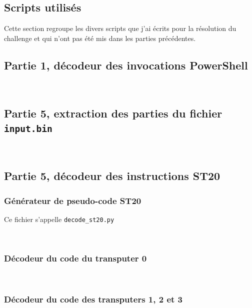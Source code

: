 \documentclass[a4paper,10pt]{article}
\newcommand{\pyinput}[1]{%
    \noindent{\color[rgb]{0.5, 0.5, 0.5}{\rule{\textwidth}{0.4pt}}}
     \\
    \noindent{\color[rgb]{0.5, 0.5, 0.5}{\rule{\textwidth}{0.4pt}}}
}
\begin{document}
\clearpage
\begin{appendices}
\section{Scripts utilisés}

Cette section regroupe les divers scripts que j'ai écrits pour la résolution du challenge et qui n'ont pas été mis dans les parties précédentes.

\subsection{Partie 1, décodeur des invocations PowerShell}
\label{ann-1-powerdecode}

\pyinput{stage1/powerdecode.py.inc.tex}

\subsection{Partie 5, extraction des parties du fichier \texttt{input.bin}}
\label{ann-5-split-input}

\pyinput{stage5/split_input.py.inc.tex}

\subsection{Partie 5, décodeur des instructions ST20}

\subsubsection{Générateur de pseudo-code ST20}
\label{ann-5-decode-st20}

Ce fichier s'appelle \texttt{decode\_st20.py}

\pyinput{stage5/decode_st20.py.inc.tex}

\subsubsection{Décodeur du code du transputer 0}
\label{ann-5-decode-trans0}

\pyinput{stage5/decode_trans0.py.inc.tex}

\subsubsection{Décodeur du code des transputers 1, 2 et 3}
\label{ann-5-decode-trans123}

\pyinput{stage5/decode_trans123.py.inc.tex}


\end{appendices}
\end{document}
